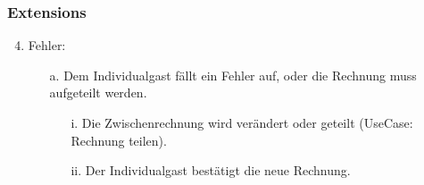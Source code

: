 \documentclass[./detailed_overview_usecases.tex]{subfiles}
\begin{document}
    \subsubsection*{Extensions}
    \begin{enumerate}
        \setcounter{enumi}{3}
        \item Fehler:
        \begin{itemize}
            \item[a.] Dem Individualgast fällt ein Fehler auf, oder die Rechnung muss aufgeteilt werden.
            \begin{itemize}
                \item[i.] Die Zwischenrechnung wird verändert oder geteilt (UseCase: Rechnung teilen).
                \item[ii.] Der Individualgast bestätigt die neue Rechnung.
            \end{itemize}
        \end{itemize}
    \end{enumerate}
\end{document}
